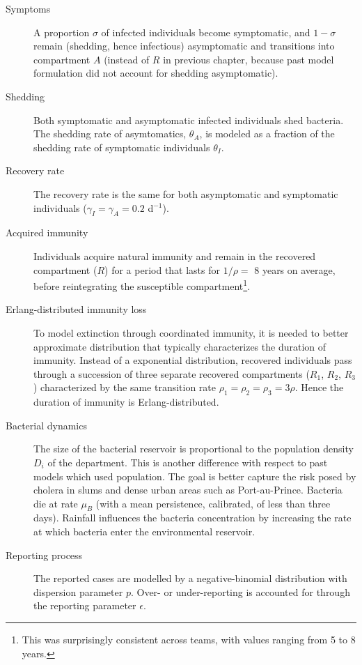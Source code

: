 \begin{description}
    \item[Symptoms] A proportion $\sigma$ of infected individuals become symptomatic, and $1-\sigma$ remain (shedding, hence infectious) asymptomatic and transitions into compartment $A$ (instead of $R$ in previous chapter, because past model formulation did not account for shedding asymptomatic).
    \item[Shedding] Both symptomatic and asymptomatic infected individuals shed bacteria. The shedding rate of asymtomatics, $\theta_A$, is modeled as a fraction of the shedding rate of symptomatic individuals  $\theta_I$\cite{Kuhn:GlucoseNotRiceBased:2014}.
    \item[Recovery rate] The recovery rate is the same for both asymptomatic and symptomatic individuals ($\gamma_I=\gamma_A=0.2$ d$^{-1}$)\cite{Kaper:Cholera:1995, Codeco:EndemicEpidemicDynamics:2001}.
    \item[Acquired immunity] Individuals acquire natural immunity and remain in the recovered compartment ($R$) for a period that lasts for $1/\rho=$ 8 years on average, before reintegrating the susceptible compartment\footnote{This was surprisingly consistent across teams, with values ranging from 5 to 8 years.}.
    \item[Erlang-distributed immunity loss] To model extinction through coordinated immunity, it is needed to better approximate distribution that typically characterizes the duration of immunity\cite{King:InapparentInfectionsCholera:2008}. Instead of a exponential distribution, recovered individuals pass through a succession of three separate recovered compartments ($R_1$, $R_2$, $R_3$) characterized by the same transition rate $\rho_1=\rho_2=\rho_3=3\rho$. Hence the duration of immunity is Erlang-distributed.
    \item[Bacterial dynamics] The size of the bacterial reservoir is proportional to the population density $D_i$ of the department. This is another difference with respect to past models which used population. The goal is better capture the risk posed by cholera in slums and dense urban areas such as Port-au-Prince. Bacteria die at rate $\mu_B$ (with a mean persistence, calibrated, of less than three days). Rainfall influences the bacteria concentration by increasing the rate at which bacteria enter the environmental reservoir.
    \item[Reporting process] The reported cases are modelled by a negative-binomial distribution with dispersion parameter $p$. Over- or under-reporting is accounted for through the reporting parameter $\epsilon$.
\end{description}
    
